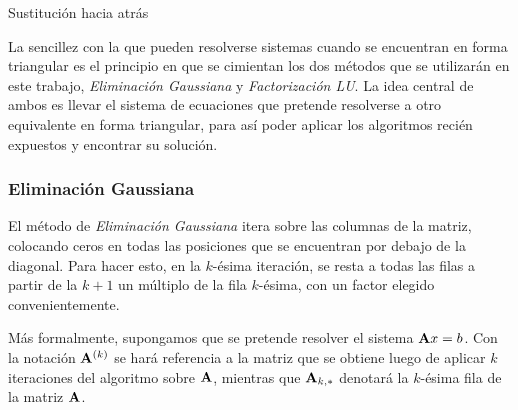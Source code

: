         \vspace{.5em}
        \begin{algorithm}[H]
            \caption{Sustitución hacia atrás} \label{alg:backward-substitution}
        \end{algorithm}
        \vspace{.5em}

        La sencillez con la que pueden resolverse sistemas cuando se encuentran en forma triangular es el principio en que se cimientan los dos métodos que se utilizarán en este trabajo, \emph{Eliminación Gaussiana} y \emph{Factorización LU}. La idea central de ambos es llevar el sistema de ecuaciones que pretende resolverse a otro equivalente en forma triangular, para así poder aplicar los algoritmos recién expuestos y encontrar su solución.

        \subsubsection{Eliminación Gaussiana}

            El método de \emph{Eliminación Gaussiana} itera sobre las columnas de la matriz, colocando ceros en todas las posiciones que se encuentran por debajo de la diagonal. Para hacer esto, en la $k$-ésima iteración, se resta a todas las filas a partir de la $k + 1$ un múltiplo de la fila $k$-ésima, con un factor elegido convenientemente.

            Más formalmente, supongamos que se pretende resolver el sistema $\mathbf{A}x = b$. Con la notación $\mathbf{A}^{(k)}$ se hará referencia a la matriz que se obtiene luego de aplicar $k$ iteraciones del algoritmo sobre $\mathbf{A}$, mientras que $\mathbf{A}_{k,*}$ denotará la $k$-ésima fila de la matriz $\mathbf{A}$.

